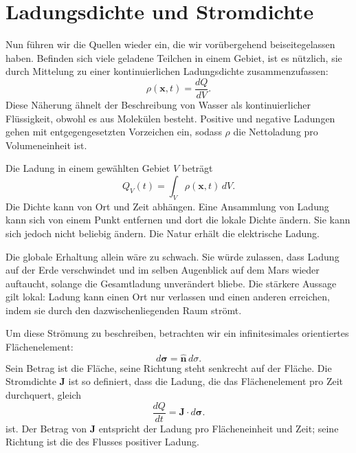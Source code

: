 \section{Ladungsdichte und Stromdichte}

Nun führen wir die Quellen wieder ein, die wir vorübergehend beiseitegelassen haben. Befinden sich viele geladene Teilchen in einem Gebiet, ist es nützlich, sie durch Mittelung zu einer kontinuierlichen Ladungsdichte zusammenzufassen:
\begin{equation}
\rho(\mathbf x,t)=\frac{dQ}{dV}.
\end{equation}
Diese Näherung ähnelt der Beschreibung von Wasser als kontinuierlicher Flüssigkeit, obwohl es aus Molekülen besteht. Positive und negative Ladungen gehen mit entgegengesetzten Vorzeichen ein, sodass \(\rho\) die Nettoladung pro Volumeneinheit ist.

Die Ladung in einem gewählten Gebiet \(V\) beträgt
\begin{equation}
Q_V(t)=\int_V\rho(\mathbf x,t)\,dV.
\label{eq:charge-volume}
\end{equation}
Die Dichte kann von Ort und Zeit abhängen. Eine Ansammlung von Ladung kann sich von einem Punkt entfernen und dort die lokale Dichte ändern. Sie kann sich jedoch nicht beliebig ändern. Die Natur erhält die elektrische Ladung.

Die globale Erhaltung allein wäre zu schwach. Sie würde zulassen, dass Ladung auf der Erde verschwindet und im selben Augenblick auf dem Mars wieder auftaucht, solange die Gesamtladung unverändert bliebe. Die stärkere Aussage gilt lokal: Ladung kann einen Ort nur verlassen und einen anderen erreichen, indem sie durch den dazwischenliegenden Raum strömt.

Um diese Strömung zu beschreiben, betrachten wir ein infinitesimales orientiertes Flächenelement:
\begin{equation}
d\boldsymbol\sigma=\widehat{\mathbf n}\,d\sigma.
\end{equation}
Sein Betrag ist die Fläche, seine Richtung steht senkrecht auf der Fläche. Die Stromdichte \(\mathbf J\) ist so definiert, dass die Ladung, die das Flächenelement pro Zeit durchquert, gleich
\begin{equation}
\frac{dQ}{dt}=\mathbf J\cdot d\boldsymbol\sigma.
\label{eq:current-flux-element}
\end{equation}
ist. Der Betrag von \(\mathbf J\) entspricht der Ladung pro Flächeneinheit und Zeit; seine Richtung ist die des Flusses positiver Ladung.

